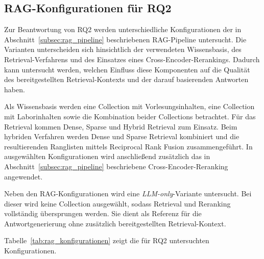 \subsection{RAG-Konfigurationen für RQ2}
\label{subsec:Die RAG-Konfigurationen}
 
Zur Beantwortung von RQ2 werden unterschiedliche Konfigurationen der in Abschnitt~\ref{subsec:rag_pipeline} beschriebenen RAG-Pipeline untersucht. Die Varianten unterscheiden sich hinsichtlich der verwendeten Wissensbasis, des Retrieval-Verfahrens und des Einsatzes eines Cross-Encoder-Rerankings. Dadurch kann untersucht werden, welchen Einfluss diese Komponenten auf die Qualität des bereitgestellten Retrieval-Kontexts und der darauf basierenden Antworten haben.
 
Als Wissensbasis werden eine Collection mit Vorlesungsinhalten, eine Collection mit Laborinhalten sowie die Kombination beider Collections betrachtet. Für das Retrieval kommen Dense, Sparse und Hybrid Retrieval zum Einsatz. Beim hybriden Verfahren werden Dense und Sparse Retrieval kombiniert und die resultierenden Ranglisten mittels Reciprocal Rank Fusion zusammengeführt. In ausgewählten Konfigurationen wird anschließend zusätzlich das in Abschnitt~\ref{subsec:rag_pipeline} beschriebene Cross-Encoder-Reranking angewendet.
 
Neben den RAG-Konfigurationen wird eine \textit{LLM-only}-Variante untersucht. Bei dieser wird keine Collection ausgewählt, sodass Retrieval und Reranking vollständig übersprungen werden. Sie dient als Referenz für die Antwortgenerierung ohne zusätzlich bereitgestellten Retrieval-Kontext.
 
Tabelle~\ref{tab:rag_konfigurationen} zeigt die für RQ2 untersuchten Konfigurationen.
 
